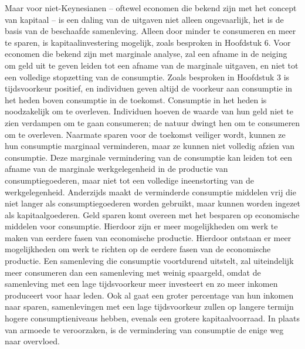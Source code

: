 Maar voor niet-Keynesianen -- oftewel economen die bekend zijn met het concept van kapitaal -- is een daling van de uitgaven niet alleen ongevaarlijk, het is de basis van de beschaafde samenleving. Alleen door minder te consumeren en meer te sparen, is kapitaalinvestering mogelijk, zoals besproken in Hoofdstuk 6. Voor economen die bekend zijn met marginale analyse, zal een afname in de neiging om geld uit te geven leiden tot een afname van de marginale uitgaven, en niet tot een volledige stopzetting van de consumptie. Zoals besproken in Hoofdstuk 3 is tijdsvoorkeur positief, en individuen geven altijd de voorkeur aan consumptie in het heden boven consumptie in de toekomst. Consumptie in het heden is noodzakelijk om te overleven. Individuen hoeven de waarde van hun geld niet te zien verdampen om te gaan consumeren; de natuur dwingt hen om te consumeren om te overleven. Naarmate sparen voor de toekomst veiliger wordt, kunnen ze hun consumptie marginaal verminderen, maar ze kunnen niet volledig afzien van consumptie. Deze marginale vermindering van de consumptie kan leiden tot een afname van de marginale werkgelegenheid in de productie van consumptiegoederen, maar niet tot een volledige ineenstorting van de werkgelegenheid. Anderzijds maakt de verminderde
consumptie middelen vrij die niet langer als consumptiegoederen worden gebruikt, maar kunnen worden ingezet als kapitaalgoederen. Geld sparen komt overeen met het besparen op economische middelen voor consumptie. Hierdoor zijn er meer mogelijkheden om werk te maken van eerdere fasen van economische productie. Hierdoor ontstaan er meer mogelijkheden om werk te richten op de eerdere fasen van de economische productie. Een samenleving die consumptie voortdurend uitstelt, zal uiteindelijk meer consumeren dan een samenleving met weinig spaargeld, omdat de samenleving met een lage tijdsvoorkeur meer investeert en zo meer inkomen produceert voor haar leden. Ook al gaat een groter percentage van hun inkomen naar sparen, samenlevingen met een lage tijdsvoorkeur zullen op langere termijn hogere consumptieniveaus hebben, evenals een grotere kapitaalvoorraad. In plaats van armoede te veroorzaken, is de vermindering van consumptie de enige weg naar overvloed.
